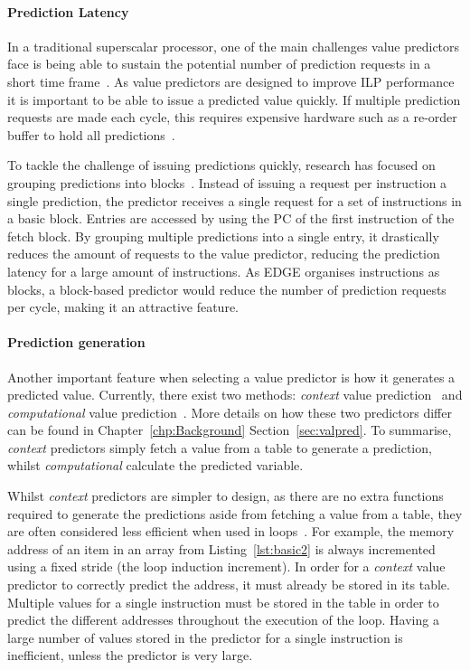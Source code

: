 \paragraph*{Prediction Latency}
In a traditional superscalar processor, one of the main challenges value predictors face is being able to sustain the potential number of prediction requests in a short time frame~\cite{peraisBeBop2015}.
As value predictors are designed to improve ILP performance it is important to be able to issue a predicted value quickly.
If multiple prediction requests are made each cycle, this requires expensive hardware such as a re-order buffer to hold all predictions~\cite{peraisBeBop2015}.

To tackle the challenge of issuing predictions quickly, research has focused on grouping predictions into blocks~\cite{peraisBeBop2015}.
Instead of issuing a request per instruction a single prediction, the predictor receives a single request for a set of instructions in a basic block.
Entries are accessed by using the PC of the first instruction of the fetch block.
By grouping multiple predictions into a single entry, it drastically reduces the amount of requests to the value predictor, reducing the prediction latency for a large amount of instructions.
As EDGE organises instructions as blocks, a block-based predictor would reduce the number of prediction requests per cycle, making it an attractive feature.

\paragraph*{Prediction generation} Another important feature when selecting a value predictor is how it generates a predicted value.
Currently, there exist two methods: \textit{context} value prediction~\cite{peraisVTAGE2014} and \textit{computational} value prediction~\cite{peraisBeBop2015,gabbayVPOrig,goeman01dfcm}.
More details on how these two predictors differ can be found in Chapter~\ref{chp:Background} Section~\ref{sec:valpred}.
To summarise, \textit{context} predictors simply fetch a value from a table to generate a prediction, whilst \textit{computational} calculate the predicted variable.

Whilst \textit{context} predictors are simpler to design, as there are no extra functions required to generate the predictions aside from fetching a value from a table, they are often considered less efficient when used in loops~\cite{peraisBeBop2015}.
For example, the memory address of an item in an array from Listing~\ref{lst:basic2} is always incremented using a fixed stride (the loop induction increment).
In order for a \textit{context} value predictor to correctly predict the address, it must already be stored in its table.
Multiple values for a single instruction must be stored in the table in order to predict the different addresses throughout the execution of the loop.
Having a large number of values stored in the predictor for a single instruction is inefficient, unless the predictor is very large.

